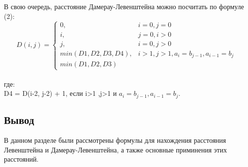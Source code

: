 \documentclass[a4paper, 14pt]{article}
\begin{document}
\begin{center}
\begin{flushleft}
		В свою очередь, расстояние Дамерау-Левенштейна можно посчитать по формуле (2):
		\begin{equation}
			D(i,j) = \left\{ \begin{array}{ll}
			0, & \textrm{$i = 0, j = 0$}\\
			i, & \textrm{$j = 0, i > 0$}\\
 			j, & \textrm{$i = 0, j > 0$}\\
			min(D1,D2,D3,D4), & i>1 , j>1, a_{i} = b_{j-1},a_{i-1}=b_{j}  \\
			min(D1,D2,D3)
  			\end{array} \right.
		\end{equation}
		\\где:\\
		D4 = D(i-2, j-2) + 1, если i>1 ,j>1 и $a_{i} = b_{j-1},a_{i-1}=b_{j} $.\\
		\end{flushleft}
    \end{center}
    \begin{center}
    \subsection{Вывод}
    \end{center}

    В данном разделе были рассмотрены формулы для нахождения расстояния Левенштейна и Дамерау-Левенштейна, а также основные приминения этих расстояний.\\
\end{document}
